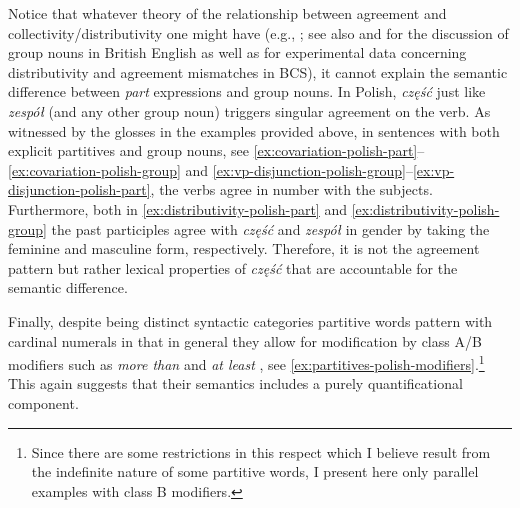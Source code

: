 Notice that whatever theory of the relationship between agreement and collectivity/distributivity one might have (e.g., \citealt{de_vries2015shifting}; see also \citealt{schwarzschild1996pluralities} and \citealt{pearson2011new} for the discussion of group nouns in British English as well as  \citealt{bosnic2016distributivity} for experimental data concerning distributivity and agreement mismatches in BCS), it cannot explain the semantic difference between \textit{part} expressions and group nouns. In Polish, \textit{część} just like \textit{zespół} (and any other group noun) triggers singular agreement on the verb. As witnessed by the glosses in the examples provided above, in sentences with both explicit partitives and group nouns, see \ref{ex:covariation-polish-part}--\ref{ex:covariation-polish-group} and \ref{ex:vp-disjunction-polish-group}--\ref{ex:vp-disjunction-polish-part}, the verbs agree in number with the subjects. Furthermore, both in \ref{ex:distributivity-polish-part} and \ref{ex:distributivity-polish-group} the past participles agree with \textit{część} and \textit{zespół} in gender by taking the feminine and masculine form, respectively. Therefore, it is not the agreement pattern but rather lexical properties of \textit{część} that are accountable for the semantic difference.

Finally, despite being distinct syntactic categories partitive words pattern with cardinal numerals in that in general they allow for modification by class A/B modifiers such as \textit{more than} and \textit{at least} \citep{nouwen2010two,nouwen2016plurality,brasoveanu2012modified}, see \ref{ex:partitives-polish-modifiers}.\footnote{Since there are some restrictions in this respect which I believe result from the indefinite nature of some partitive words, I present here only parallel examples with class B modifiers.} This again suggests that their semantics includes a purely quantificational component.

